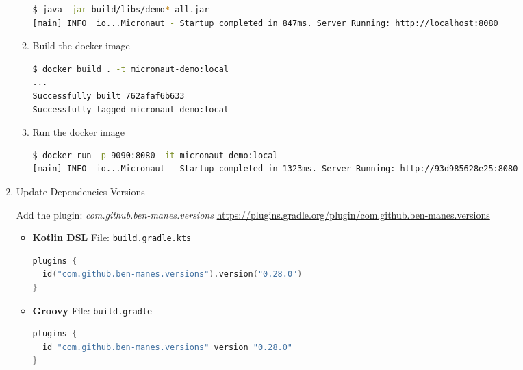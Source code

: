 \begin{enumerate}
\begin{enumerate}
\begin{lstlisting}[language=bash]
$ java -jar build/libs/demo*-all.jar
[main] INFO  io...Micronaut - Startup completed in 847ms. Server Running: http://localhost:8080
\end{lstlisting}

\item Build the docker image

\begin{lstlisting}[language=bash]
$ docker build . -t micronaut-demo:local
...
Successfully built 762afaf6b633
Successfully tagged micronaut-demo:local
\end{lstlisting}

\item Run the docker image

\begin{lstlisting}[language=bash]
$ docker run -p 9090:8080 -it micronaut-demo:local
[main] INFO  io...Micronaut - Startup completed in 1323ms. Server Running: http://93d985628e25:8080
\end{lstlisting}

\end{enumerate}

\item Update Dependencies Versions

Add the plugin: \textit{com.github.ben-manes.versions}
\newline
{\footnotesize \url{https://plugins.gradle.org/plugin/com.github.ben-manes.versions}}

\begin{itemize}

\item[] \textbf{Kotlin DSL}
\newline
File: \texttt{build.gradle.kts}

\begin{lstlisting}[language=Kotlin]
plugins {
  id("com.github.ben-manes.versions").version("0.28.0")
}
\end{lstlisting}

\item[] \textbf{Groovy}
\newline
File: \texttt{build.gradle}

\begin{lstlisting}[language=Groovy]
plugins {
  id "com.github.ben-manes.versions" version "0.28.0"
}
\end{lstlisting}

\end{itemize}


\end{enumerate}
